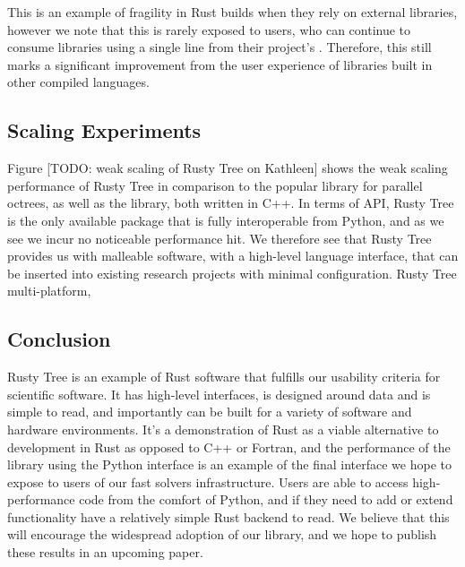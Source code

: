 This is an example of fragility in Rust builds when they rely on external libraries, however we note that this is rarely exposed to users, who can continue to consume libraries using a single line from their project's . Therefore, this still marks a significant improvement from the user experience of libraries built in other compiled languages.

\subsection*{Scaling Experiments}

Figure [TODO: weak scaling of Rusty Tree on Kathleen] shows the weak scaling performance of Rusty Tree in comparison to the popular  library for parallel octrees, as well as the  library, both written in C++. In terms of API, Rusty Tree is the only available package that is fully interoperable from Python, and as we see we incur no noticeable performance hit. We therefore see that Rusty Tree provides us with malleable software, with a high-level language interface, that can be inserted into existing research projects with minimal configuration. Rusty Tree multi-platform,

\subsection*{Conclusion}

Rusty Tree is an example of Rust software that fulfills our usability criteria for scientific software. It has high-level interfaces, is designed around data and is simple to read, and importantly can be built for a variety of software and hardware environments. It's a demonstration of Rust as a viable alternative to development in Rust as opposed to C++ or Fortran, and the performance of the library using the Python interface is an example of the final interface we hope to expose to users of our fast solvers infrastructure. Users are able to access high-performance code from the comfort of Python, and if they need to add or extend functionality have a relatively simple Rust backend to read. We believe that this will encourage the widespread adoption of our library, and we hope to publish these results in an upcoming paper.
